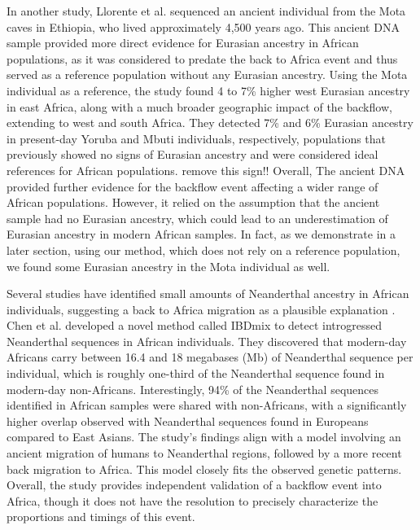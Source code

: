 In another study, Llorente et al. \cite{llorente2015ancient} sequenced an ancient individual from the Mota caves in Ethiopia, who lived approximately 4,500 years ago. %
%
This ancient DNA sample provided more direct evidence for Eurasian ancestry in African populations, as it was considered to predate the back to Africa event and thus served as a reference population without any Eurasian ancestry.
%
Using the Mota individual as a reference, the study found 4 to 7\% higher west Eurasian ancestry in east Africa, along with a much broader geographic impact of the backflow, extending to west and south Africa. 
%
They detected 7\% and 6\% Eurasian ancestry in present-day Yoruba and Mbuti individuals, respectively, populations that previously showed no signs of Eurasian ancestry and were considered ideal references for African populations. remove this sign!! %
%
Overall, The ancient DNA provided further evidence for the backflow event affecting a wider range of African populations. However, it relied on the assumption that the ancient sample had no Eurasian ancestry, which could lead to an underestimation of Eurasian ancestry in modern African samples.
%
In fact, as we demonstrate in a later section, using our method, which does not rely on a reference population, we found some Eurasian ancestry in the Mota individual as well.

Several studies have identified small amounts of Neanderthal ancestry in African individuals, suggesting a back to Africa migration as a plausible explanation \cite{chen2020identifying,vernot2016excavating}. 
%
Chen et al. \cite{chen2020identifying} developed a novel method called IBDmix to detect introgressed Neanderthal sequences in African individuals. They discovered that modern-day Africans carry between 16.4 and 18 megabases (Mb) of Neanderthal sequence per individual, which is roughly one-third of the Neanderthal sequence found in modern-day non-Africans. 
%
Interestingly, 94\% of the Neanderthal sequences identified in African samples were shared with non-Africans, with a significantly higher overlap observed with Neanderthal sequences found in Europeans compared to East Asians.
%
The study's findings align with a model involving an ancient migration of humans to Neanderthal regions, followed by a more recent back migration to Africa. This model closely fits the observed genetic patterns.
%
Overall, the study provides independent validation of a backflow event into Africa, though it does not have the resolution to precisely characterize the proportions and timings of this event.

